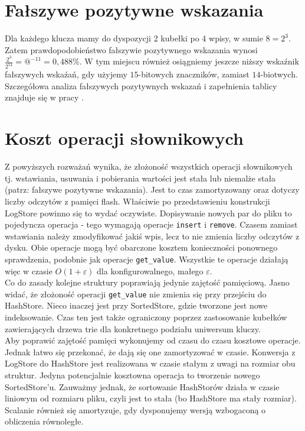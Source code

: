 \documentclass[declaration,shortabstract,masc]{iithesis}
\begin{document}
		\section{Fałszywe pozytywne wskazania}
			Dla każdego klucza mamy do dyspozycji 2 kubełki po 4 wpisy, w sumie $8=2^3$. Zatem prawdopodobieństwo fałszywie pozytywnego wskazania wynosi $\frac{2^3}{2^14} = @^{-11} = 0,488$\%. W tym miejscu również osiągniemy jeszcze niższy wskaźnik fałszywych wskaźań, gdy użyjemy $15$-bitowych znaczników, zamiast $14$-biotwych. Szczegółowa analiza fałszywych pozytywnych wskazań i zapełnienia tablicy znajduje się w pracy \cite{PKCH}.
		\section{Koszt operacji słownikowych}
			Z powyższych rozważań wynika, że złożoność wszystkich operacji słownikowych tj. wstawiania, usuwania i pobierania wartości jest stała lub niemalże stała (patrz: fałszywe pozytywne wskazania). Jest to czas zamortyzowany oraz dotyczy liczby odczytów z pamięci flash. Właściwie po przedstawieniu konstrukcji LogStore powinno się to wydać oczywiste. Dopisywanie nowych par do pliku to pojedyncza operacja - tego wymagają operacje \texttt{insert} i \texttt{remove}. Czasem zamiast wstawiania należy zmodyfikować jakiś wpis, lecz to nie zmienia liczby odczytów z dysku. Obie operacje mogą być obarczone kosztem konieczności ponownego sprawdzenia, podobnie jak operacje \texttt{get\_value}. Wszystkie te operacje działają więc w czasie $O(1+\varepsilon)$ dla konfigurowalnego, małego $\varepsilon$.\\
			\indent Co do zasady kolejne struktury poprawiają jedynie zajętość pamięciową. Jasno widać, że złożoność operacji \texttt{get\_value} nie zmienia się przy przejściu do HashStore. Nieco inaczej jest przy SortedStore, gdzie tworzone jest nowe indeksowanie. Czas ten jest także ograniczony poprzez zastosowanie kubełków zawierających drzewa trie dla konkretnego podziału uniwersum kluczy.\\
			\indent Aby poprawić zajętość pamięci wykonujemy od czasu do czasu kosztowe operacje. Jednak łatwo się przekonać, że dają się one zamortyzować w czasie. Konwersja z LogStore do HashStore jest realizowana w czasie stałym z uwagi na rozmiar obu struktur. Jedyna potencjalnie kosztowna operacja to tworzenie nowego SortedStore'u. Zauważmy jednak, że sortowanie HashStorów działa w czasie liniowym od rozmiaru pliku, czyli jest to stała (bo HashStore ma stały rozmiar). Scalanie również się amortyzuje, gdy dysponujemy wersją wzbogaconą o obliczenia równoległe.
\end{document}
